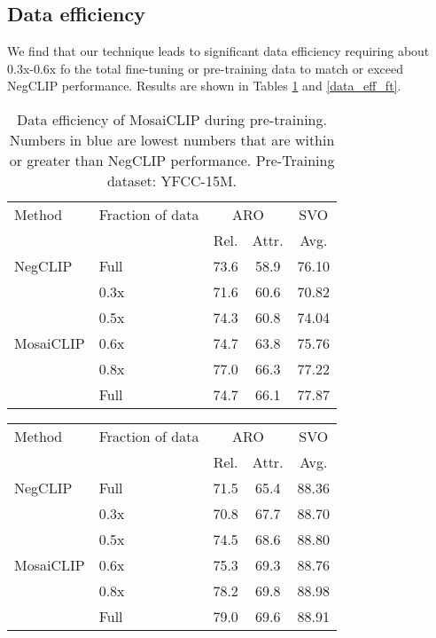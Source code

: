 \documentclass[11pt]{article}
\newcommand{\methodcomp}{MosaiCLIP}
\newcommand{\negclip}{NegCLIP}
\begin{document}
\begin{table}[h!]
\subsection{Data efficiency}
\label{data_eff}
We find that our technique leads to significant data efficiency requiring about 0.3x-0.6x fo the total fine-tuning or pre-training data to match or exceed \negclip{} performance. Results are shown in Tables \ref{data_eff_pretr} and \ref{data_eff_ft}.
\begin{table}[h!]
\small
\centering
    \begin{tabular}{llcc|c}
    \toprule
    {Method} & Fraction of data& \multicolumn{2}{c|}{ARO} & \multicolumn{1}{c}{SVO} \\
    \cmidrule(lr){3-4} \cmidrule(lr){5-5}
    & & Rel. & Attr. & Avg. \\
    \midrule
    \negclip{} & Full & 73.6 & 58.9 & 76.10 \\
    \midrule
    \multirow{5}{*}{\methodcomp{}} & 0.3x & 71.6 & {\color{blue}60.6} & 70.82 \\
    & 0.5x & {\color{blue}74.3} & 60.8 & 74.04 \\
    & 0.6x & 74.7 & 63.8 & {\color{blue}75.76} \\
    & 0.8x & 77.0 & 66.3 & 77.22 \\
    & Full & 74.7 & 66.1 & 77.87 \\
    \bottomrule
    \end{tabular}

    \caption{Data efficiency of \methodcomp{} during pre-training. Numbers in blue are lowest numbers that are within  or greater than \negclip{} performance. Pre-Training dataset: YFCC-15M.}
    \label{data_eff_pretr}
\end{table}

\begin{table}[h!]
\small
\centering
    \begin{tabular}{llcc|c}
    \toprule
    {Method} & Fraction of data& \multicolumn{2}{c|}{ARO} & \multicolumn{1}{c}{SVO} \\
    \cmidrule(lr){3-4} \cmidrule(lr){5-5}
    & & Rel. & Attr. & Avg. \\
    \midrule
    \negclip{} & Full & 71.5 & 65.4 & 88.36 \\
    \midrule
    \multirow{5}{*}{\methodcomp{}} & 0.3x & {\color{blue}70.8} & {\color{blue}67.7} & {\color{blue}88.70} \\
    & 0.5x & 74.5 & 68.6 & 88.80 \\
    & 0.6x & 75.3 & 69.3 & 88.76 \\
    & 0.8x & 78.2 & 69.8 & 88.98 \\
    & Full & 79.0 & 69.6 & 88.91 \\
    \bottomrule
    \end{tabular}


\end{table}
\end{table}
\end{document}
